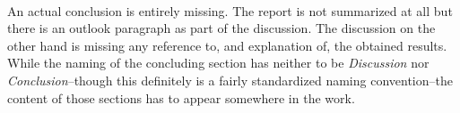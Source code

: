 \documentclass[../review.tex]{subfiles}
\begin{document}
 \textcolor{green}{\Large\checkmark}\\
An actual conclusion is entirely missing. The report is not summarized at all but there is an outlook paragraph as part of the discussion. The discussion on the other hand is missing any reference to, and explanation of, the obtained results. While the naming of the concluding section has neither to be \textit{Discussion} nor \textit{Conclusion}--though this definitely is a fairly standardized naming convention--the content of those sections has to appear somewhere in the work.
\end{document}
